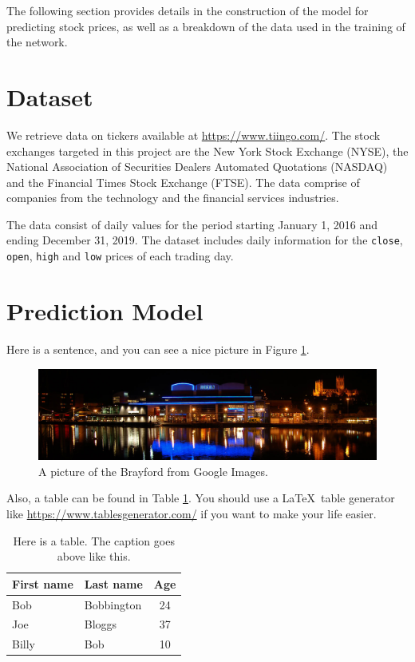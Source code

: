 The following section provides details in the construction of the model for predicting stock prices, as well as a breakdown of the data used in the training of the network.

\section{Dataset}
We retrieve data on tickers available at \url{https://www.tiingo.com/}. The stock exchanges targeted in this project are the New York Stock Exchange (NYSE), the National Association of Securities Dealers Automated Quotations (NASDAQ) and the Financial Times Stock Exchange (FTSE). The data comprise of companies from the technology and the financial services industries.

The data consist of daily values for the period starting January 1, 2016 and ending December 31, 2019. The dataset includes daily information for the \texttt{close}, \texttt{open}, \texttt{high} and \texttt{low} prices of each trading day.

\section{Prediction Model}

Here is a sentence, and you can see a nice picture in Figure \ref{fig:brayford}.

\begin{figure}[ht]
    \centering
    \includegraphics[width=\textwidth]{figures/brayford.jpg}
    \caption{A picture of the Brayford from Google Images.}
    \label{fig:brayford}
\end{figure}

Also, a table can be found in Table \ref{tbl:example-table}. You should use a \LaTeX~table generator like \url{https://www.tablesgenerator.com/} if you want to make your life easier.

\begin{table}[ht]
    \caption{Here is a table. The caption goes above like this.}
    \centering
    \begin{tabular}{l|l|c}
        First name & Last name & Age \\
        \hline\hline
        Bob & Bobbington & 24 \\
        Joe & Bloggs & 37 \\
        Billy & Bob & 10 \\

    \end{tabular}
    \label{tbl:example-table}
\end{table}